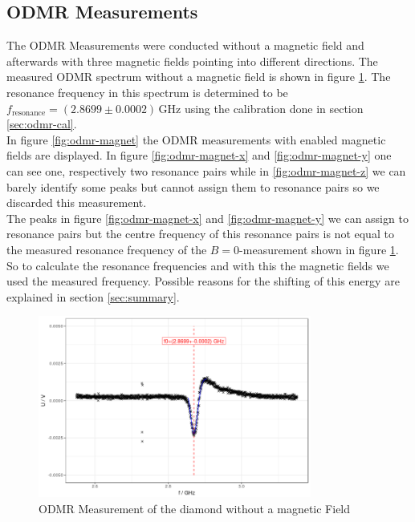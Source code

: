\subsection{ODMR Measurements}

The ODMR Measurements were conducted without a magnetic field and afterwards with three magnetic fields pointing into different directions. The measured ODMR spectrum without a magnetic field is shown in figure \ref{fig:odmr-no-B}. The resonance frequency in this spectrum is determined to be $f_\text{resonance}=(2.8699\pm0.0002)\,\mathrm{GHz}$ using the calibration done in section \ref{sec:odmr-cal}.\\

In figure \ref{fig:odmr-magnet} the ODMR measurements with enabled magnetic fields are displayed. In figure \ref{fig:odmr-magnet-x} and \ref{fig:odmr-magnet-y} one can see one, respectively two resonance pairs while in \ref{fig:odmr-magnet-z} we can barely identify some peaks but cannot assign them to resonance pairs so we discarded this measurement.\\

The peaks in figure \ref{fig:odmr-magnet-x} and \ref{fig:odmr-magnet-y} we can assign to resonance pairs but the centre frequency of this resonance pairs is not equal to the measured resonance frequency of the $B=0$-measurement shown in figure \ref{fig:odmr-no-B}. So to calculate the resonance frequencies and with this the magnetic fields we used the measured frequency. Possible reasons for the shifting of this energy are explained in section \ref{sec:summary}.

\begin{figure}
	\centering
	\includegraphics[width=0.8\textwidth]{../figures/odmr-1.png}
	\caption{ODMR Measurement of the diamond without a magnetic Field}
	\label{fig:odmr-no-B}
\end{figure}


